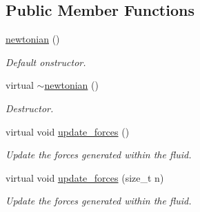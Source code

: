 \subsection*{Public Member Functions}
\begin{DoxyCompactItemize}
\item 
\mbox{\label{classphysim_1_1fluids_1_1newtonian_a4a08503213e230d59e56a42fa221d676}} 
\hyperlink{classphysim_1_1fluids_1_1newtonian_a4a08503213e230d59e56a42fa221d676}{newtonian} ()
\begin{DoxyCompactList}\small\item\em Default onstructor. \end{DoxyCompactList}\item 
\mbox{\label{classphysim_1_1fluids_1_1newtonian_a460303778bb2ecb7fd0dbed6f9988422}} 
virtual \hyperlink{classphysim_1_1fluids_1_1newtonian_a460303778bb2ecb7fd0dbed6f9988422}{$\sim$newtonian} ()
\begin{DoxyCompactList}\small\item\em Destructor. \end{DoxyCompactList}\item 
virtual void \hyperlink{classphysim_1_1fluids_1_1newtonian_accfe7d69d2d3985e8ec8c8179a6cf5ba}{update\+\_\+forces} ()
\begin{DoxyCompactList}\small\item\em Update the forces generated within the fluid. \end{DoxyCompactList}\item 
virtual void \hyperlink{classphysim_1_1fluids_1_1newtonian_a2ad3a26c489e0167f16cc4cd2ead981d}{update\+\_\+forces} (size\+\_\+t n)
\begin{DoxyCompactList}\small\item\em Update the forces generated within the fluid. \end{DoxyCompactList}\end{DoxyCompactItemize}
